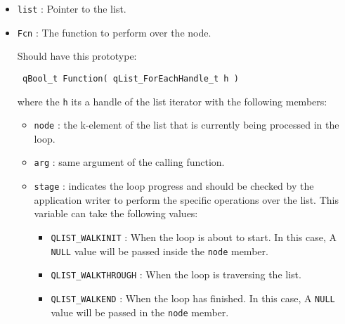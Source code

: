 \begin{itemize}
    \item \lstinline{list} : Pointer to the list.
    \item \lstinline{Fcn} : The function to perform over the node. 
                            
                            Should have this prototype:
                            
                            \lstinline{ qBool_t Function( qList_ForEachHandle_t h ) }
                            
                            where the \lstinline{h} its a handle of the list iterator with the following members:
                            
                            
                            \begin{itemize}
                                \item \lstinline{node} : the k-element of the list that is currently being processed in the loop.
                                \item \lstinline{arg} : same argument of the calling function.
                                \item  \lstinline{stage} : indicates the loop progress and should be checked by the application writer to perform the specific operations over the list. This variable can take the following values:
                                \begin{itemize}
                                    \item \lstinline{QLIST_WALKINIT} : When the loop is about to start. In this case, A \lstinline{NULL} value will be passed inside the \lstinline{node} member.
                                    \item \lstinline{QLIST_WALKTHROUGH} : When the loop is traversing the list.
                                    \item \lstinline{QLIST_WALKEND} :  When the loop has finished. In this case, A \lstinline{NULL} value will be passed in the \lstinline{node} member. 
                                \end{itemize}
                            \end{itemize}
                            

\end{itemize}
